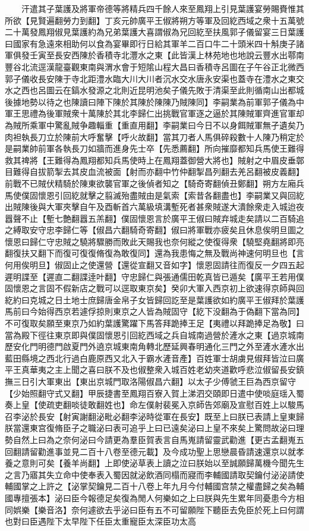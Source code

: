 　　汗遣其子葉護及將軍帝德等將精兵四千餘人來至鳳翔上引見葉護宴勞賜賚惟其所欲【見賢遍翻勞力到翻】丁亥元帥廣平王俶將朔方等軍及回紇西域之衆十五萬號二十萬發鳳翔俶見葉護約為兄弟葉護大喜謂俶為兄回紇至扶風郭子儀留宴三日葉護曰國家有急遠來相助何以食為宴畢即行日給其軍羊二百口牛二十頭米四十斛庚子諸軍俱發壬寅至長安西陳於香積寺北灃水之東【此皆漢上林苑地也地說云豐水出鄠南豐谷北流逕漢龍臺觀東南與渭水會于短隂山程大昌曰香積寺呂圖在子午谷正北微西郭子儀收長安陳于寺北距澧水臨大川大川者沉水交水唐永安渠也蓋寺在澧水之東交水之西也呂圖云在鎬水發源之北則近昆明池矣子儀先敗于清渠至此則循南山出都城後據地勢以待之也陳讀曰陣下陳於其陳於陳陳乃賊陳同】李嗣業為前軍郭子儀為中軍王思禮為後軍賊衆十萬陳於其北李歸仁出挑戰官軍逐之逼於其陳賊軍齊進官軍却為賊所乘軍中驚亂賊争趣輜重【重直用翻】李嗣業曰今日不以身餌賊軍無孑遺矣乃肉袒執長刀立於陳前大呼奮擊【呼火故翻】當其刀者人馬俱碎殺數十人陳乃稍定於是嗣業帥前軍各執長刀如牆而進身先士卒【先悉薦翻】所向摧靡都知兵馬使王難得救其禆將【王難得為鳳翔都知兵馬使時上在鳳翔蓋御營大將也】賊射之中眉皮垂鄣目難得自拔箭掣去其皮血流被面【射而亦翻中竹仲翻掣昌列翻去羌呂翻被皮義翻】前戰不已賊伏精騎於陳東欲襲官軍之後偵者知之【騎奇寄翻偵丑鄭翻】朔方左廂兵馬使僕固懷恩引回紇就擊之翦滅殆盡賊由是氣索【索昔各翻盡也】李嗣業又與回紇出賊陳後與大軍夾擊自午及酉斬首六萬級填溝塹死者甚衆賊遂大潰餘衆走入城迨夜囂聲不止【塹七艶翻囂五羔翻】僕固懷恩言於廣平王俶曰賊弃城走矣請以二百騎追之縛取安守忠李歸仁等【俶昌六翻騎奇寄翻】俶曰將軍戰亦疲矣且休息俟明旦圖之懷恩曰歸仁守忠賊之驍將驟勝而敗此天賜我也奈何縱之使復得衆【驍堅堯翻將即亮翻復扶又翻下而復可復復脩復為敢復同】還為我患悔之無及戰尚神速何明旦也【言何用俟明旦】俶固止之使還營【還從宣翻又音如字】懷恩固請往而復反一夕四五起遲明諜至【遲直二翻諜逹叶翻】守忠歸仁與張通儒田乾真皆已遁矣【廣平王若用僕固懷恩之言固不假新店之戰可以逕取東京矣】癸卯大軍入西京初上欲速得京師與回紇約曰克城之日土地士庶歸唐金帛子女皆歸回訖至是葉護欲如約廣平王俶拜於葉護馬前曰今始得西京若遽俘掠則東京之人皆為賊固守【紇下没翻為于偽翻下當為同】不可復取矣願至東京乃如約葉護驚躍下馬答拜跪捧王足【夷禮以拜跪捧足為敬】曰當為殿下徑往東京即與僕固懷恩引回紇西域之兵自城南過營於滻水之東【過京城南歷安化門明德門啟夏門外遶京城東南角轉北歷延興春明通化三門之外至滻水滻水出藍田縣境之西北行過白鹿原西又北入于霸水滻音產】百姓軍士胡虜見俶拜皆泣曰廣平王真華夷之主上聞之喜曰朕不及也俶整衆入城百姓老幼夾道歡呼悲泣俶留長安鎮撫三日引大軍東出【東出京城門取洛陽俶昌六翻】以太子少傅虢王巨為西京留守【少始照翻守式又翻】甲辰捷書至鳳翔百寮入賀上涕泗交頤即日遣中使啖庭瑶入蜀奏上皇【使疏吏翻啖徒敢翻姓也】命左僕射裴冕入京師告郊廟及宣慰百姓上以駿馬召李泌於長安【射寅謝翻泌毗必翻李泌時從軍在長安】既至上曰朕已表請上皇東歸朕當還東宫復脩臣子之職泌曰表可追乎上曰已遠矣泌曰上皇不來矣上驚問故泌曰理勢自然上曰為之奈何泌曰今請更為羣臣賀表言自馬嵬請留靈武勸進【更古孟翻嵬五回翻請留勸進事並見二百十八卷至德元載】及今成功聖上思戀晨昏請速還京以就孝養之意則可矣【養羊尚翻】上即使泌草表上讀之泣曰朕始以至誠願歸萬機今聞先生之言乃寤其失立命中使奉表入蜀因就泌飲酒同榻而寢而李輔國請取契鑰付泌泌請使輔國掌之上許之【泌掌契鑰見二百十八卷上年九月今付輔國宫禁之權盡歸之矣為輔國專擅張本】泌曰臣今報德足矣復為閒人何樂如之上曰朕與先生累年同憂患今方相同娯樂【樂音洛】奈何遽欲去乎泌曰臣有五不可留願陛下聽臣去免臣於死上曰何謂也對曰臣遇陛下太早陛下任臣太重寵臣太深臣功太高